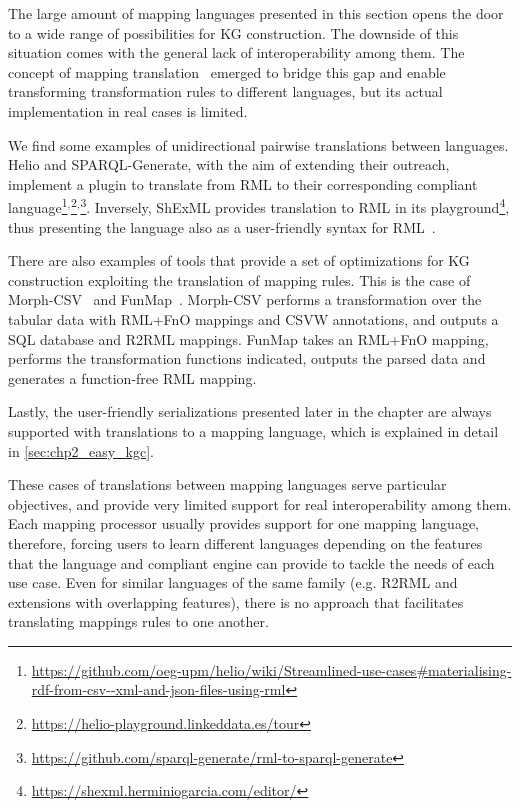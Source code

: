 The large amount of mapping languages presented in this section opens the door to a wide range of possibilities for KG construction. The downside of this situation comes with the general lack of interoperability among them. The concept of mapping translation~\parencite{corcho2020towards} emerged to bridge this gap and enable  transforming transformation rules to different languages, but its actual implementation in real cases is limited.

We find some examples of unidirectional pairwise translations between languages. 
Helio and SPARQL-Generate, with the aim of extending their outreach, implement a plugin to translate from RML to their corresponding compliant language\footnote{\url{https://github.com/oeg-upm/helio/wiki/Streamlined-use-cases\#materialising-rdf-from-csv--xml-and-json-files-using-rml}}$^,$\footnote{\url{https://helio-playground.linkeddata.es/tour}}$^,$\footnote{\url{https://github.com/sparql-generate/rml-to-sparql-generate}}. Inversely, ShExML provides translation to RML in its playground\footnote{\url{https://shexml.herminiogarcia.com/editor/}}, thus presenting the language also as a user-friendly syntax for RML~\parencite{Garcia-Gonzalez2020shexml}. 

There are also examples of tools that provide a set of optimizations for KG construction exploiting the translation of mapping rules. This is the case of Morph-CSV~\parencite{chaves2021morph-csv} and FunMap~\parencite{jozashoori2020funmap}. Morph-CSV performs a transformation over the tabular data with RML+FnO mappings and CSVW annotations, and outputs a SQL database and R2RML mappings. FunMap takes an RML+FnO mapping, performs the transformation functions indicated, outputs the parsed data and generates a function-free RML mapping.

Lastly, the user-friendly serializations presented later in the chapter are always supported with translations to a mapping language, which is explained in detail in \cref{sec:chp2_easy_kgc}.

These cases of translations between mapping languages serve particular objectives, and provide very limited support for real interoperability among them. Each mapping processor usually provides support for one mapping language, therefore, forcing users to learn different languages depending on the features that the language and compliant engine can provide to tackle the needs of each use case. Even for similar languages of the same family (e.g. R2RML and extensions with overlapping features), there is no approach that facilitates translating mappings rules to one another. 

